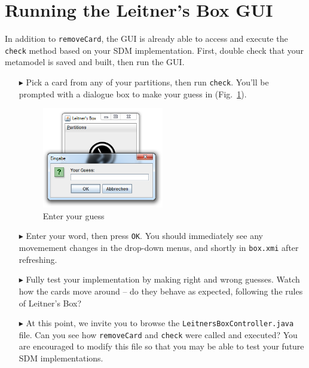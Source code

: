 \newpage
\hypertarget{sec:extendGui}{}
\section{Running the Leitner's Box GUI}
\genHeader

In addition to \texttt{removeCard}, the GUI is already able to access and execute the \texttt{check} method based on your SDM implementation. First, double
check that your metamodel is saved and built, then run the GUI. 

\begin{itemize}
\item[$\blacktriangleright$] Pick a card from any of your partitions, then run \texttt{check}. You'll be prompted with a dialogue box to make your guess in
(Fig.~\ref{fig:checkGuess}).

\vspace{0.5cm}

\begin{figure}[htp]
\begin{center}
  \includegraphics[width=0.5\textwidth]{gui_checkGuess}
  \caption{Enter your guess}
  \label{fig:checkGuess}
\end{center}
\end{figure}

\item[$\blacktriangleright$] Enter your word, then press \texttt{OK}. You should immediately see any movemement changes in the drop-down menus, and shortly in
\texttt{box.xmi} after refreshing.

\vspace{0.5cm}

\item[$\blacktriangleright$] Fully test your implementation by making right and wrong guesses. Watch how the cards move around -- do they
behave as expected, following the rules of Leitner's Box?

\vspace{0.5cm}

\item[$\blacktriangleright$] At this point, we invite you to browse the \texttt{Leitners\-Box\-Control\-ler.java} file. Can you see how \texttt{removeCard} and
\texttt{check} were called and executed? You are encouraged to modify this file so that you may be able to test your future SDM implementations.

\end{itemize}
